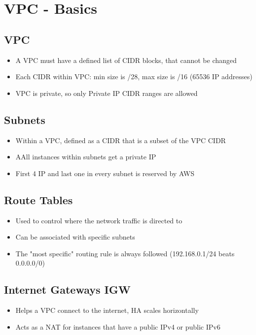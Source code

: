\section{VPC - Basics}

\subsection{VPC}
\begin{itemize}
    \item A VPC must have a defined list of CIDR blocks, that cannot be changed
    \item Each CIDR within VPC: min size is /28, max size is /16 (65536 IP addresses)
    \item VPC is private, so only Private IP CIDR ranges are allowed
\end{itemize}

\subsection{Subnets}
\begin{itemize}
    \item Within a VPC, defined as a CIDR that is a subset of the VPC CIDR
    \item AAll instances within subnets get a private IP
    \item First 4 IP and last one in every subnet is reserved by AWS
\end{itemize}

\subsection{Route Tables}
\begin{itemize}
    \item Used to control where the network traffic is directed to
    \item Can be associated with specific subnets
    \item The "most specific" routing rule is always followed (192.168.0.1/24 beats 0.0.0.0/0)
\end{itemize}

\subsection{Internet Gateways IGW}
\begin{itemize}
    \item Helps a VPC connect to the internet, HA scales horizontally
    \item Acts as a NAT for instances that have a public IPv4 or public IPv6
\end{itemize}

